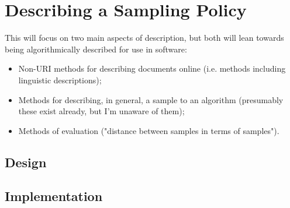 \section{Describing a Sampling Policy}
This will focus on two main aspects of description, but both will lean towards being algorithmically described for use in software:
\begin{itemize}
	\item Non-URI methods for describing documents online (i.e. methods including linguistic descriptions);
	\item Methods for describing, in general, a sample to an algorithm (presumably these exist already, but I'm unaware of them);
	\item Methods of evaluation ("distance between samples in terms of samples").
\end{itemize}




\subsection{Design}


\subsection{Implementation}



